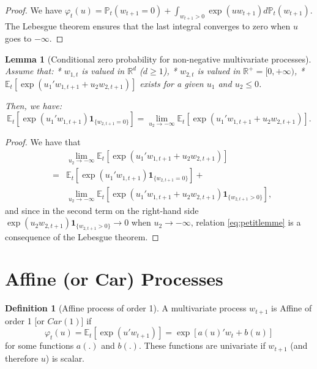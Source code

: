 \documentclass[
  12pt,
]{book}
\newtheorem{lemma}{Lemma}[chapter]
\theoremstyle{definition}
\newtheorem{definition}{Definition}[chapter]
\theoremstyle{definition}
\theoremstyle{definition}
\theoremstyle{definition}
\theoremstyle{remark}
\begin{document}
\begin{proof}
We have \(\varphi_t(u) = \mathbb{P}_t(w_{t+1} = 0) + \int_{w_{t+1}> 0} \exp(u w_{t+1}) d\mathbb{P}_t(w_{t+1})\). The Lebesgue theorem ensures that the last integral converges to zero when \(u\) goes to \(-\infty\).
\end{proof}

\begin{lemma}[Conditional zero probability for non-negative multivariate processes]
\protect\hypertarget{lem:lemPetitLemme}{}\label{lem:lemPetitLemme}Assume that:
* \(w_{1,t}\) is valued in \(\mathbb{R}^{d}\) (\(d \geq 1\)),
* \(w_{2,t}\) is valued in \(\mathbb{R}^+ = [0, + \infty )\),
* \(\mathbb{E}_t \left[ \exp \left( u_1 ' w_{1,t+1} + u_2 w_{2,t+1} \right) \right]\) exists for a given \(u_1\) and \(u_2 \leq 0\).

Then, we have:
\begin{equation}
\mathbb{E}_t \left[ \exp( u_1 ' w_{1,t+1})  \textbf{1}_{\{w_{2,t+1} = 0 \}} \right] =  \underset{u_2 \rightarrow -\infty}{\lim} \mathbb{E}_t \left[ \exp( u_1 ' w_{1,t+1} + u_2   w_{2,t+1} )  \right].\label{eq:petitlemme}
\end{equation}
\end{lemma}

\begin{proof}
We have that
\begin{eqnarray*}
&&\underset{u_2 \rightarrow -\infty}{\lim} \mathbb{E}_t \left[ \exp( u_1 ' w_{1,t+1} + u_2   w_{2,t+1} )  \right] \\
&=& \mathbb{E}_t \left[ \exp( u_1 ' w_{1,t+1})   \textbf{1}_{\{w_{2,t+1} = 0 \}} \right] +\\
&& \underset{u_2 \rightarrow -\infty}{\lim}   \mathbb{E}_t \left[ \exp( u_1 ' w_{1,t+1} + u_2   w_{2,t+1} )  \textbf{1}_{\{w_{2,t+1} > 0 \}}  \right] ,
\end{eqnarray*}
and since in the second term on the right-hand side \(\exp(u_2 w_{2,t+1}) \textbf{1}_{\{w_{2,t+1} > 0 \}} \rightarrow 0\) when \(u_2 \rightarrow -\infty\), relation \eqref{eq:petitlemme} is a consequence of the Lebesgue theorem.
\end{proof}

\hypertarget{AffineCar}{%
\section{Affine (or Car) Processes}\label{AffineCar}}

\begin{definition}[Affine process of order 1]
\protect\hypertarget{def:Car1}{}\label{def:Car1}A multivariate process \(w_{t+1}\) is Affine of order 1 {[}or \(Car(1)\){]} if
\[
\varphi_t(u)=\mathbb{E}_t[\exp(u'w_{t+1})]=\exp[a(u)'w_t+b(u)]
\]
for some functions \(a(.)\) and \(b(.)\). These functions are univariate if \(w_{t+1}\) (and therefore \(u\)) is scalar.
\end{definition}
\end{document}
